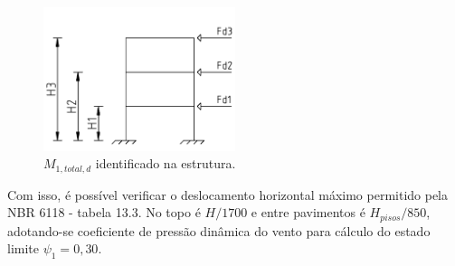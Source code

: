 \begin{figure}[H]
	\begin{center}
	\caption{$M_{1, total, d}$ identificado na estrutura.}
    	\includegraphics[width=0.5\textwidth]{Coeficiente-gamma-z/Imagens/M1-total-d.png}
	\end{center}
\end{figure}

Com isso, é possível verificar o deslocamento horizontal máximo permitido pela NBR 6118 - tabela 13.3. No topo é $H/1700$ e entre pavimentos é $H_{pisos}/850$, adotando-se coeficiente de pressão dinâmica do vento para cálculo do estado limite $\psi_1=0,30$.